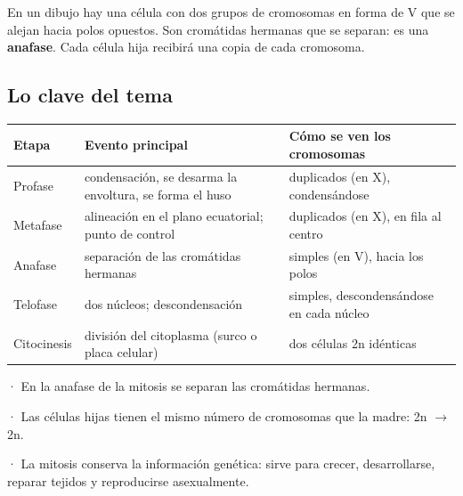 \begin{ejemplo} En un dibujo hay una célula con dos grupos de cromosomas en forma de V que se alejan hacia polos opuestos. Son cromátidas hermanas que se separan: es una \textbf{anafase}. Cada célula hija recibirá una copia de cada cromosoma.\end{ejemplo}
\subsection{Lo clave del tema}
\begin{center}\small
\begin{tabularx}{\linewidth}{@{}>{\raggedright\arraybackslash\hsize=0.45\hsize}X>{\raggedright\arraybackslash\hsize=1.28\hsize}X>{\raggedright\arraybackslash\hsize=1.28\hsize}X@{}}
\toprule
\textbf{Etapa} & \textbf{Evento principal} & \textbf{Cómo se ven los cromosomas} \\
\midrule
Profase & condensación, se desarma la envoltura, se forma el huso & duplicados (en X), condensándose \\
Metafase & alineación en el plano ecuatorial; punto de control & duplicados (en X), en fila al centro \\
Anafase & separación de las cromátidas hermanas & simples (en V), hacia los polos \\
Telofase & dos núcleos; descondensación & simples, descondensándose en cada núcleo \\
Citocinesis & división del citoplasma (surco o placa celular) & dos células 2n idénticas \\
\bottomrule
\end{tabularx}
\end{center}
 
\begin{clave}[{Recuerda}] · En la anafase de la mitosis se separan las cromátidas hermanas.\par · Las células hijas tienen el mismo número de cromosomas que la madre: 2n \ensuremath{\rightarrow} 2n.\par · La mitosis conserva la información genética: sirve para crecer, desarrollarse, reparar tejidos y reproducirse asexualmente.\end{clave}
 
